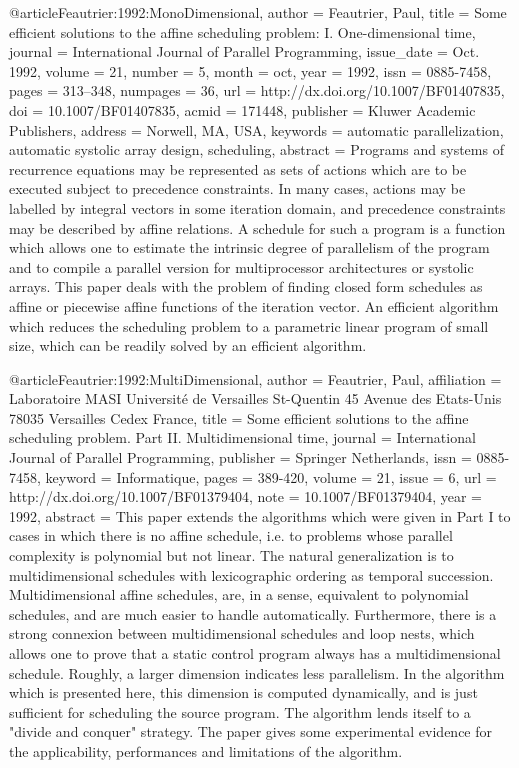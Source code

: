 @article{Feautrier:1992:MonoDimensional,
 author = {Feautrier, Paul},
 title = {Some efficient solutions to the affine scheduling problem: I. One-dimensional time},
 journal = {International Journal of Parallel Programming},
 issue_date = {Oct. 1992},
 volume = {21},
 number = {5},
 month = oct,
 year = {1992},
 issn = {0885-7458},
 pages = {313--348},
 numpages = {36},
 url = {http://dx.doi.org/10.1007/BF01407835},
 doi = {10.1007/BF01407835},
 acmid = {171448},
 publisher = {Kluwer Academic Publishers},
 address = {Norwell, MA, USA},
 keywords = {automatic parallelization, automatic systolic array design, scheduling},
 abstract = {Programs and systems of recurrence equations may be represented as sets of actions which are to be executed subject to precedence constraints. In many cases, actions may be labelled by integral vectors in some iteration domain, and precedence constraints may be described by affine relations. A schedule for such a program is a function which allows one to estimate the intrinsic degree of parallelism of the program and to compile a parallel version for multiprocessor architectures or systolic arrays. This paper deals with the problem of finding closed form schedules as affine or piecewise affine functions of the iteration vector. An efficient algorithm which reduces the scheduling problem to a parametric linear program of small size, which can be readily solved by an efficient algorithm.}
}

@article{Feautrier:1992:MultiDimensional,
   author = {Feautrier, Paul},
   affiliation = {Laboratoire MASI Université de Versailles St-Quentin 45 Avenue des Etats-Unis 78035 Versailles Cedex France},
   title = {Some efficient solutions to the affine scheduling problem. Part II. Multidimensional time},
   journal = {International Journal of Parallel Programming},
   publisher = {Springer Netherlands},
   issn = {0885-7458},
   keyword = {Informatique},
   pages = {389-420},
   volume = {21},
   issue = {6},
   url = {http://dx.doi.org/10.1007/BF01379404},
   note = {10.1007/BF01379404},
   year = {1992},
   abstract = {This paper extends the algorithms which were given in Part I to cases in which there is no affine schedule, i.e. to problems whose parallel complexity is polynomial but not linear. The natural generalization is to multidimensional schedules with lexicographic ordering as temporal succession. Multidimensional affine schedules, are, in a sense, equivalent to polynomial schedules, and are much easier to handle automatically. Furthermore, there is a strong connexion between multidimensional schedules and loop nests, which allows one to prove that a static control program always has a multidimensional schedule. Roughly, a larger dimension indicates less parallelism. In the algorithm which is presented here, this dimension is computed dynamically, and is just sufficient for scheduling the source program. The algorithm lends itself to a "divide and conquer" strategy. The paper gives some experimental evidence for the applicability, performances and limitations of the algorithm.}
}
